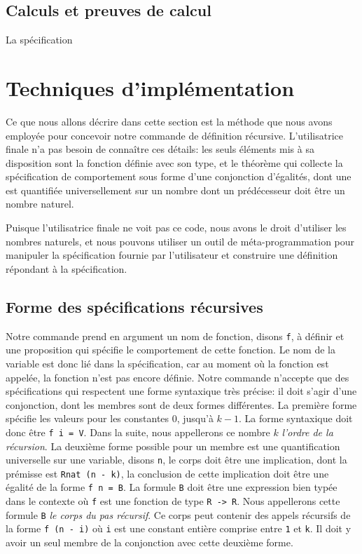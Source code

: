 \documentclass[draft]{jflart}
\begin{document}
\subsection{Calculs et preuves de calcul}
La spécification 
\section{Techniques d'implémentation}
Ce que nous allons décrire dans cette section est la méthode que nous avons
employée pour concevoir notre commande de définition récursive.
L'utilisatrice finale n'a pas besoin de connaître ces détails: les
seuls éléments mis à sa disposition sont la fonction définie avec son
type, et le théorème qui collecte la spécification de comportement
sous forme d'une conjonction d'égalités, dont une est quantifiée
universellement sur un nombre dont un prédécesseur doit être un nombre
naturel.

Puisque l'utilisatrice finale ne voit pas ce code, nous avons le droit
d'utiliser les nombres naturels, et nous pouvons utiliser un outil de
méta-programmation pour manipuler la spécification fournie par
l'utilisateur et construire une définition répondant à la
spécification.

\subsection{Forme des spécifications récursives}
Notre commande prend en argument un nom de fonction, disons \texttt{f},
à définir et une
proposition qui spécifie le comportement de cette fonction.  Le nom de
la variable est donc lié dans la spécification, car au moment où la
fonction est appelée, la fonction n'est pas encore définie.  Notre
commande n'accepte que des spécifications qui respectent une forme
syntaxique très précise: il doit s'agir d'une conjonction, dont les
membres sont de deux formes différentes.  La première forme spécifie
les valeurs pour les constantes \(0\), jusqu'à \(k - 1\).  La forme
syntaxique doit donc être \texttt{f i = V}.  Dans la suite, nous
appellerons ce nombre \(k\) {\em l'ordre de la récursion}.
La deuxième forme possible
pour un membre est une quantification universelle sur une variable,
disons \texttt{n}, le corps doit être une implication, dont la prémisse
est \texttt{Rnat (n - k)}, la conclusion de cette implication doit être
une égalité de la forme \texttt{f n = B}.  La formule \texttt{B} doit être
une expression bien typée dans le contexte où \texttt{f} est une fonction
de type \texttt{R -> R}.  Nous appellerons cette formule \texttt{B} {\em le
  corps du pas récursif}.
Ce corps peut contenir des appels récursifs de
la forme \texttt{f (n - i)} où \texttt{i} est une constant entière comprise
  entre \texttt{1} et \texttt{k}.  Il doit y avoir un seul membre de la
  conjonction avec cette deuxième forme.
\end{document}

